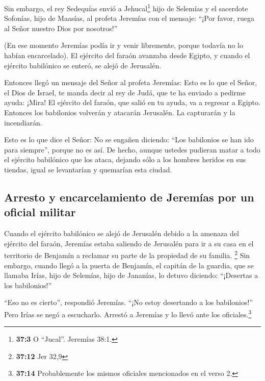  Sin embargo, el rey Sedequías envió a Jehucal\footnote{\textbf{37:3}
  O ``Jucal''. Jeremías 38:1.} hijo de Selemías y el sacerdote Sofonías,
hijo de Maasías, al profeta Jeremías con el mensaje: ``¡Por favor, ruega
al Señor nuestro Dios por nosotros!''

 (En ese momento Jeremías podía ir y venir libremente,
porque todavía no lo habían encarcelado).  El ejército del
faraón avanzaba desde Egipto, y cuando el ejército babilónico se enteró,
se alejó de Jerusalén.

 Entonces llegó un mensaje del Señor al profeta Jeremías:
 Esto es lo que el Señor, el Dios de Israel, te manda
decir al rey de Judá, que te ha enviado a pedirme ayuda: ¡Mira! El
ejército del faraón, que salió en tu ayuda, va a regresar a Egipto.
 Entonces los babilonios volverán y atacarán Jerusalén. La
capturarán y la incendiarán.

 Esto es lo que dice el Señor: No se engañen diciendo:
``Los babilonios se han ido para siempre'', porque no es así.
 De hecho, aunque ustedes pudieran matar a todo el
ejército babilónico que los ataca, dejando sólo a los hombres heridos en
sus tiendas, igual se levantarían y quemarían esta ciudad.

\hypertarget{arresto-y-encarcelamiento-de-jeremuxedas-por-un-oficial-militar}{%
\subsection{Arresto y encarcelamiento de Jeremías por un oficial
militar}\label{arresto-y-encarcelamiento-de-jeremuxedas-por-un-oficial-militar}}

 Cuando el ejército babilónico se alejó de Jerusalén
debido a la amenaza del ejército del faraón,  Jeremías
estaba saliendo de Jerusalén para ir a su casa en el territorio de
Benjamín a reclamar su parte de la propiedad de su familia. \footnote{\textbf{37:12}
  Jer 32,9}  Sin embargo, cuando llegó a la puerta de
Benjamín, el capitán de la guardia, que se llamaba Irías, hijo de
Selemías, hijo de Jananías, lo detuvo diciendo: ``¡Desertas a los
babilonios!''

 ``Eso no es cierto'', respondió Jeremías. ``¡No estoy
desertando a los babilonios!'' Pero Irías se negó a escucharlo. Arrestó
a Jeremías y lo llevó ante los oficiales.\footnote{\textbf{37:14}
  Probablemente los mismos oficiales mencionados en el verso 2.}

